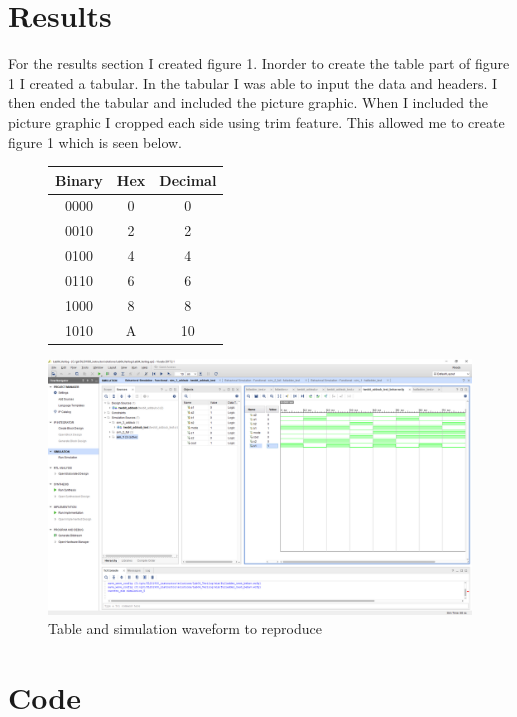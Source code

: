 \documentclass[11pt]{article}
\newcommand{\Verilog}[2][]{%
	
}
\begin{document}
\section*{Results}

For the results section I created figure 1. Inorder to create the table part of figure 1 I created a tabular. In the tabular I was able to input the data and headers. I then ended the tabular and included the picture graphic. When I included the picture graphic I cropped each side using trim feature. This allowed me to create figure 1 which is seen below.

\begin{figure}[ht]\centering
	\begin{tabular}{c|c|c}
		\toprule
		Binary & Hex & Decimal \\
		\midrule
		0000 & 0 & 0 \\
		0010 & 2 & 2 \\
		0100 & 4 & 4 \\
		0110 & 6 & 6 \\
		1000 & 8 & 8 \\
		1010 & A & 10 \\
		\bottomrule
	\end{tabular} 
	\includegraphics[width=1\textwidth,trim=18.5cm 15.75cm .5cm 4.5cm,clip]{lab1_example_screenshot.PNG}
	\caption{Table and simulation waveform to reproduce}
	\label{fig:another_image}          %
\end{figure}


\section*{Code}

\Verilog[caption=File-included from canvas]{lab1_example_code.sv}
\end{document}
